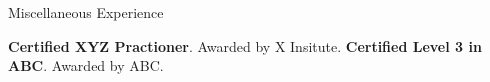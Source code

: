 \begin{rubric}{Miscellaneous Experience}
%

\entry*[2014] \textbf{Certified XYZ Practioner}. Awarded by X Insitute.
\entry*[2006] \textbf{Certified Level 3 in ABC}. Awarded by ABC.

\end{rubric}